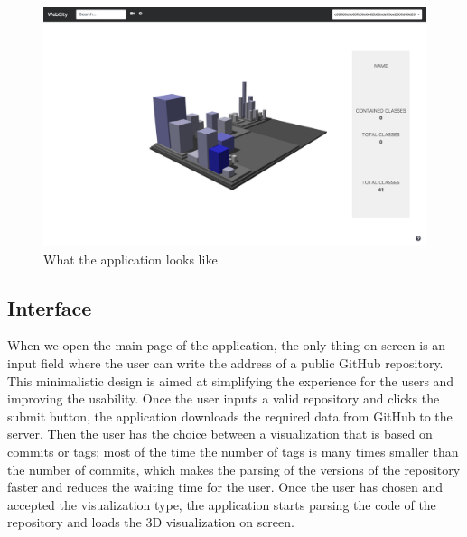 \documentclass[]{usiinfbachelorproject}
\begin{document}
\begin{figure} [H]
\centering
\includegraphics[width=1\textwidth]{pictures/app.png}
\caption{What the application looks like}
\label{fig:app}
\end{figure}

\subsection{Interface} \label{User Interface and Features}

When we open the main page of the application, the only thing on screen is an input field where the user can write the address of a public GitHub repository. This minimalistic design is aimed at simplifying the experience for the users and improving the usability. Once the user inputs a valid repository and clicks the submit button, the application downloads the required data from GitHub to the server. Then the user has the choice between a visualization that is based on commits or tags; most of the time the number of tags is many times smaller than the number of commits, which makes the parsing of the versions of the repository faster and reduces the waiting time for the user. Once the user has chosen and accepted the visualization type, the application starts parsing the code of the repository and loads the 3D visualization on screen.

%
%
\end{document}

